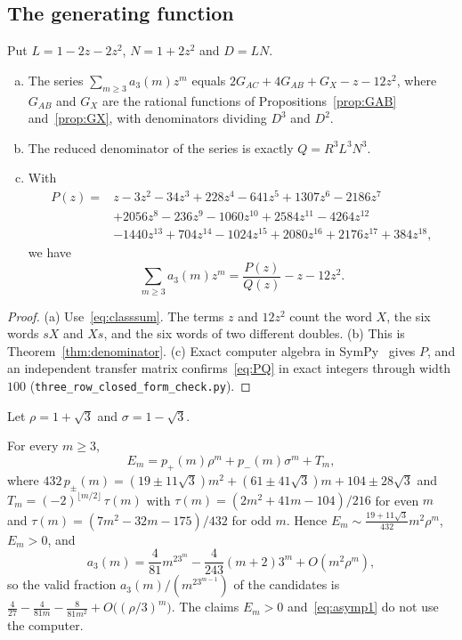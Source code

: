 \subsection{The generating function}

Put $L=1-2z-2z^2$, $N=1+2z^2$ and $D=LN$.

\begin{theorem}\label{thm:threegf}
\leavevmode
\begin{enumerate}[(a)]
\item The series $\sum_{m\ge3}a_3(m)z^m$ equals $2G_{AC}+4G_{AB}+G_X-z-12z^2$, where
$G_{AB}$ and $G_X$ are the rational functions of Propositions~\ref{prop:GAB}
and~\ref{prop:GX}, with denominators dividing $D^3$ and $D^2$.
\item The reduced denominator of the series is exactly $Q=R^3L^3N^3$.
\item With
\begin{align*}
P(z)={}&z-3z^2-34z^3+228z^4-641z^5+1307z^6-2186z^7\\
&+2056z^8-236z^9-1060z^{10}+2584z^{11}-4264z^{12}\\
&-1440z^{13}+704z^{14}-1024z^{15}+2080z^{16}+2176z^{17}+384z^{18},
\end{align*}
we have
\begin{equation}\label{eq:PQ}
\sum_{m\ge3}a_3(m)z^m=\frac{P(z)}{Q(z)}-z-12z^2.
\end{equation}
\end{enumerate}
\end{theorem}

\begin{proof}
(a) Use~\eqref{eq:classsum}. The terms $z$ and $12z^2$ count the word $X$, the six words $sX$
and $Xs$, and the six words of two different doubles. (b) This is
Theorem~\ref{thm:denominator}. (c) Exact computer algebra in SymPy~\cite{sympy2017} gives $P$, and an independent transfer matrix
confirms~\eqref{eq:PQ} in exact integers through width $100$ (\nolinkurl{three_row_closed_form_check.py}).
\end{proof}

Let $\rho=1+\sqrt3$ and $\sigma=1-\sqrt3$.

\begin{theorem}\label{thm:threeclosed}
For every $m\ge3$,
\begin{equation}\label{eq:Eclosed}
E_m=p_+(m)\rho^m+p_-(m)\sigma^m+T_m,
\end{equation}
where $432\,p_\pm(m)=(19\pm11\sqrt3)m^2+(61\pm41\sqrt3)m+104\pm28\sqrt3$ and $T_m=(-2)^{\lfloor m/2\rfloor}\,\tau(m)$ with $\tau(m)=(2m^2+41m-104)/216$ for even $m$ and
$\tau(m)=(7m^2-32m-175)/432$ for odd $m$. Hence $E_m\sim\frac{19+11\sqrt3}{432}m^2\rho^m$,
$E_m>0$, and
\begin{equation}\label{eq:asymp1}
a_3(m)=\frac4{81}m^23^m-\frac4{243}(m+2)3^m+O(m^2\rho^m),
\end{equation}
so the valid fraction $a_3(m)/(m^23^{m-1})$ of the candidates is
$\frac4{27}-\frac4{81m}-\frac8{81m^2}+O\bigl((\rho/3)^m\bigr)$. The claims $E_m>0$ and~\eqref{eq:asymp1} do not use the computer.
\end{theorem}

